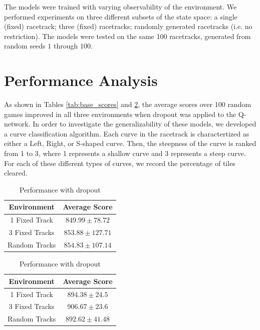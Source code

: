 \documentclass{article}
\begin{document}
The models were trained with varying observability of the
environment. We performed experiments on three different subsets of
the state space: a single (fixed) racetrack; three (fixed) racetracks;
randomly generated racetracks (i.e. no restriction). The models were
tested on the same 100 racetracks, generated from random seeds $1$
through $100$. 

\section{Performance Analysis}
As shown in Tables \ref{tab:base_scores} and \ref{tab:drop_scores},
the average scores over 100 random games improved in all three
environments when dropout was applied to the Q-network. In order to
investigate the generalizability of these models, we developed a curve
classification algorithm. Each curve in the racetrack is
charactertized as either a Left, Right, or S-shaped curve. Then, the
steepness of the curve is ranked from 1 to 3, where 1 represents a
shallow curve and 3 represents a steep curve. For each of these
different types of curves, we record the percentage of tiles cleared.   

\begin{table}[h!]
\begin{center}
\begin{minipage}[t]{.4\textwidth}
  \begin{tabular}{c|c}
    \textbf{Environment} & \textbf{Average Score}\\ \hline
    1 Fixed Track & $849.99\pm78.72$ \\
    3 Fixed Tracks & $853.88\pm127.71$ \\
    Random Tracks & $854.83\pm107.14$ \\
  \end{tabular}
  \caption{Performance without dropout}
  \label{tab:base_scores}
\end{minipage}
\hspace{1cm}
\begin{minipage}[t]{.4\textwidth}
  \begin{tabular}{c|c}
    \textbf{Environment} & \textbf{Average Score}\\
    \hline
    1 Fixed Track & $894.38\pm24.5$ \\
    3 Fixed Tracks &  $906.67\pm23.6$ \\
    Random Tracks & $892.62\pm41.48$ \\
  \end{tabular}
  \caption{Performance with dropout}
  \label{tab:drop_scores}
\end{minipage}
\end{center}
\vspace{-5mm}
\end{table}
\end{document}
